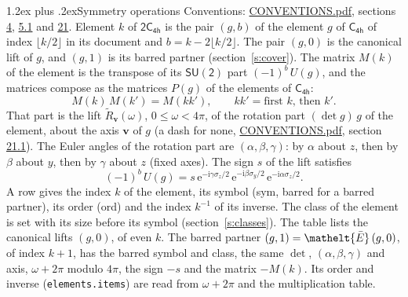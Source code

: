 \documentclass[10pt,a4paper]{article}
\makeatletter
\renewcommand\section{\@startsection{section}{1}{\z@}{-3ex plus -1ex minus -.2ex}%
  {1.2ex plus .2ex}{\normalfont\large\sffamily\bfseries\color{parttitle}}}
\numberwithin{equation}{section}
\newcommand{\eltfont}[1]{{\let\sigma\eltsigma\mathelt{#1}}}
\newcommand{\grp}[1]{\mathsf{#1}}
\newcommand{\elt}[1]{\eltfont{#1}}
\newcommand{\vv}{\mathbf{v}}
\newcommand{\iunit}{\mathrm{i}}
\newcommand{\expe}{\mathrm{e}}
\newcommand{\barred}[1]{\bar{#1}}
\newcommand{\lift}[1]{\tilde{#1}}
\newcommand{\pauli}[1]{\sigma_{#1}}
\makeatother
\begin{document}
\section{Symmetry operations}\label{s:elements}
Conventions: \href{../../CONVENTIONS.pdf}{CONVENTIONS.pdf}, sections \href{../../../rotation/CONVENTIONS.pdf\#conv.4}{4}, \href{../../../rotation/CONVENTIONS.pdf\#conv.5.1}{5.1} and \href{../../CONVENTIONS.pdf\#conv.21}{21}.
\leavevmode\label{n:index.element}\label{n:element.g}Element $k$ of $\grp{2C_{4h}}$ is the pair $(g, b)$ of the element $g$ of \href{../../../rotation/data/pdf/C4h.pdf}{$\grp{C_{4h}}$} of index $\lfloor k/2\rfloor$ in its document and $b = k - 2\lfloor k/2\rfloor$. The pair $(g, 0)$ is the canonical lift of $g$, and $(g, 1)$ is its barred partner (section~\ref{s:cover}). \label{n:matrix.element.pin}\label{n:matrix.element}The matrix $M(k)$ of the element is the transpose of its $\grp{SU(2)}$ part $(-1)^{b}\,U(g)$, and the matrices compose as the matrices $P(g)$ of the elements of $\grp{C_{4h}}$:
\begin{equation}\label{e:mprod}M(k)\,M(k') = M(kk'),\qquad kk' = \text{first } k\text{, then } k'.\end{equation}
\leavevmode\label{n:angle.omega}\label{n:vector.axis}\label{n:vector.pole}That part is the lift $\lift{R}_{\vv}(\omega)$, $0 \le \omega < 4\pi$, of the rotation part $(\det g)\,g$ of the element, about the axis $\vv$ of $g$ (a dash for none, \href{../../CONVENTIONS.pdf}{CONVENTIONS.pdf}, section \href{../../CONVENTIONS.pdf\#conv.21.1}{21.1}). \label{n:angle.euler.alpha}\label{n:angle.euler.beta}\label{n:angle.euler.gamma}\label{n:vector.coordinates}The Euler angles of the rotation part are $(\alpha,\beta,\gamma)$: by $\alpha$ about $z$, then by $\beta$ about $y$, then by $\gamma$ about $z$ (fixed axes). \label{n:local.euler.sign}The sign $s$ of the lift satisfies
\begin{equation}\label{e:euler}(-1)^{b}\,U(g) = s\,\expe^{-\iunit\gamma\pauli{z}/2}\,\expe^{-\iunit\beta\pauli{y}/2}\,\expe^{-\iunit\alpha\pauli{z}/2}.\end{equation}
\leavevmode\label{n:index.element.inverse}\label{n:head.sym}\label{n:head.ord}A row gives the index $k$ of the element, its symbol (sym, barred for a barred partner), its order (ord) and the index $k^{-1}$ of its inverse. \label{n:head.class}The class of the element is set with its size before its symbol (section~\ref{s:classes}).
The table lists the canonical lifts $(g, 0)$, of even $k$. The barred partner $(g, 1) = \elt{\barred{E}}\,(g, 0)$, of index $k + 1$, has the barred symbol and class, the same $\det$, $(\alpha,\beta,\gamma)$ and axis, $\omega + 2\pi$ modulo $4\pi$, the sign $-s$ and the matrix $-M(k)$. Its order and inverse (\texttt{elements.items}) are read from $\omega + 2\pi$ and the multiplication table.
\end{document}

